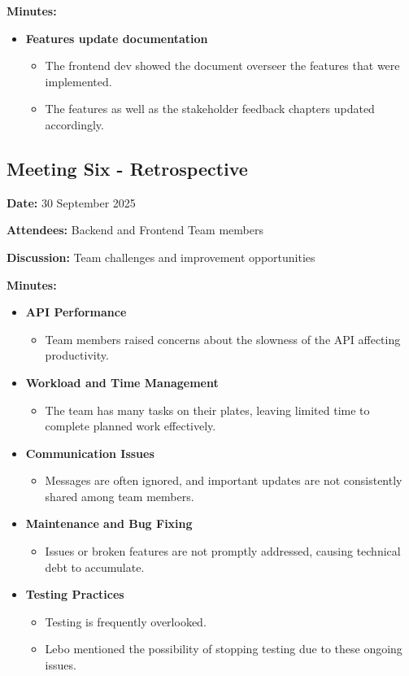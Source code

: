 \textbf{Minutes:}
\begin{itemize}
    \item \textbf{Features update documentation}
    \begin{itemize}
        \item The frontend dev showed the document overseer the features that were implemented.
        \item The features as well as the stakeholder feedback chapters updated accordingly.
    \end{itemize}

    

\end{itemize}

\subsection{Meeting Six - Retrospective}
\textbf{Date:} 30 September 2025 \par
\textbf{Attendees:} Backend and Frontend Team members \par
\textbf{Discussion:} Team challenges and improvement opportunities

\textbf{Minutes:}
\begin{itemize}
    \item \textbf{API Performance}
    \begin{itemize}
        \item Team members raised concerns about the slowness of the API affecting productivity.
    \end{itemize}
    
    \item \textbf{Workload and Time Management}
    \begin{itemize}
        \item The team has many tasks on their plates, leaving limited time to complete planned work effectively.
    \end{itemize}
    
    \item \textbf{Communication Issues}
    \begin{itemize}
        \item Messages are often ignored, and important updates are not consistently shared among team members.
    \end{itemize}
    
    \item \textbf{Maintenance and Bug Fixing}
    \begin{itemize}
        \item Issues or broken features are not promptly addressed, causing technical debt to accumulate.
    \end{itemize}
    
    \item \textbf{Testing Practices}
    \begin{itemize}
        \item Testing is frequently overlooked.
        \item Lebo mentioned the possibility of stopping testing due to these ongoing issues.
    \end{itemize}
\end{itemize}


